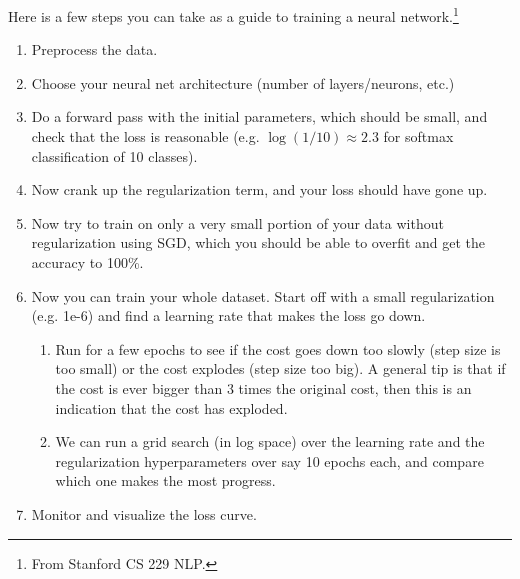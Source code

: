 Here is a few steps you can take as a guide to training a neural network.\footnote{From Stanford CS 229 NLP.}
\begin{enumerate}
  \item Preprocess the data. 
  \item Choose your neural net architecture (number of layers/neurons, etc.) 
  \item Do a forward pass with the initial parameters, which should be small, and check that the loss is reasonable (e.g. $\log(1/10) \approx 2.3$ for softmax classification of 10 classes). 
  \item Now crank up the regularization term, and your loss should have gone up. 
  \item Now try to train on only a very small portion of your data without regularization using SGD, which you should be able to overfit and get the accuracy to 100\%. 
  \item Now you can train your whole dataset. Start off with a small regularization (e.g. 1e-6) and find a learning rate that makes the loss go down. 
  \begin{enumerate}
      \item Run for a few epochs to see if the cost goes down too slowly (step size is too small) or the cost explodes (step size too big). A general tip is that if the cost is ever bigger than $3$ times the original cost, then this is an indication that the cost has exploded. 
      \item We can run a grid search (in log space) over the learning rate and the regularization hyperparameters over say 10 epochs each, and compare which one makes the most progress. 
  \end{enumerate}
  \item Monitor and visualize the loss curve. 

  \begin{figure}[H]
    \centering 
\end{figure}
\end{enumerate}

